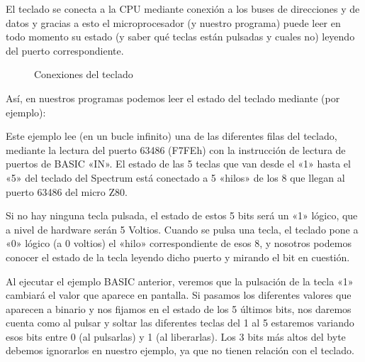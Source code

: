 \documentclass[letterpaper,10pt,spanish]{sphinxmanual}
\begin{document}
El teclado se conecta a la CPU mediante conexión a los buses de direcciones y de datos y gracias a esto el microprocesador (y nuestro programa) puede leer en todo momento su estado (y saber qué teclas están pulsadas y cuales no) leyendo del puerto correspondiente.

\begin{figure}[htbp]
\centering
\capstart

\noindent{}
\caption{Conexiones del teclado}\label{\detokenize{03_arquitectura/arquitectura:id5}}\end{figure}

Así, en nuestros programas podemos leer el estado del teclado mediante (por ejemplo):

\begin{sphinxVerbatim}[commandchars=\\\{\}]
\end{sphinxVerbatim}

Este ejemplo lee (en un bucle infinito) una de las diferentes filas del teclado, mediante la lectura del puerto 63486 (F7FEh) con la instrucción de lectura de puertos de BASIC «IN». El estado de las 5 teclas que van desde el «1» hasta el «5» del teclado del Spectrum está conectado a 5 «hilos» de los 8 que llegan al puerto 63486 del micro Z80.

Si no hay ninguna tecla pulsada, el estado de estos 5 bits será un «1» lógico, que a nivel de hardware serán 5 Voltios. Cuando se pulsa una tecla, el teclado pone a «0» lógico (a 0 voltios) el «hilo» correspondiente de esos 8, y nosotros podemos conocer el estado de la tecla leyendo dicho puerto y mirando el bit en cuestión.

Al ejecutar el ejemplo BASIC anterior, veremos que la pulsación de la tecla «1» cambiará el valor que aparece en pantalla. Si pasamos los diferentes valores que aparecen a binario y nos fijamos en el estado de los 5 últimos bits, nos daremos cuenta como al pulsar y soltar las diferentes teclas del 1 al 5 estaremos variando esos bits entre 0 (al pulsarlas) y 1 (al liberarlas). Los 3 bits más altos del byte debemos ignorarlos en nuestro ejemplo, ya que no tienen relación con el teclado.
\end{document}
